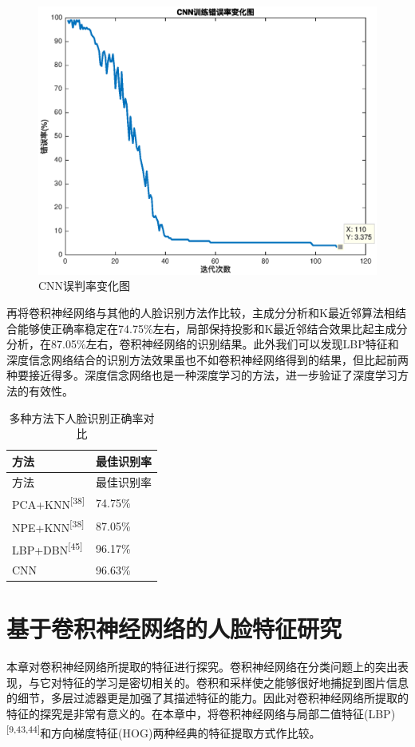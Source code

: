\documentclass[bachelor,zhspacing]{cqu}  %
\begin{document}
\begin{figure}[htbp]
\centering
\includegraphics[width=5.72917in]{./pic/cnn-err.eps}
\caption{CNN误判率变化图}\label{fig:cnn-err}
\end{figure}

再将卷积神经网络与其他的人脸识别方法作比较，主成分分析和K最近邻算法相结合能够使正确率稳定在74.75\%左右，局部保持投影和K最近邻结合效果比起主成分分析，在87.05\%左右，卷积神经网络的识别结果。此外我们可以发现LBP特征和深度信念网络结合的识别方法效果虽也不如卷积神经网络得到的结果，但比起前两种要接近得多。深度信念网络也是一种深度学习的方法，进一步验证了深度学习方法的有效性。

\begin{longtable}[]{@{}ll@{}}
\caption{\label{tbl:cnn-res}多种方法下人脸识别正确率对比
}\tabularnewline
\toprule
方法 & 最佳识别率\tabularnewline
\midrule
\endfirsthead
\toprule
方法 & 最佳识别率\tabularnewline
\midrule
\endhead
PCA+KNN\textsuperscript{{[}38{]}} & 74.75\%\tabularnewline
NPE+KNN\textsuperscript{{[}38{]}} & 87.05\%\tabularnewline
LBP+DBN\textsuperscript{{[}45{]}} & 96.17\%\tabularnewline
CNN & 96.63\%\tabularnewline
\bottomrule
\end{longtable}

\section{基于卷积神经网络的人脸特征研究}\label{ux57faux4e8eux5377ux79efux795eux7ecfux7f51ux7edcux7684ux4ebaux8138ux7279ux5f81ux7814ux7a76}

本章对卷积神经网络所提取的特征进行探究。卷积神经网络在分类问题上的突出表现，与它对特征的学习是密切相关的。卷积和采样使之能够很好地捕捉到图片信息的细节，多层过滤器更是加强了其描述特征的能力。因此对卷积神经网络所提取的特征的探究是非常有意义的。在本章中，将卷积神经网络与局部二值特征(LBP)\textsuperscript{{[}9,43,44{]}}和方向梯度特征(HOG)两种经典的特征提取方式作比较。
\end{document}
